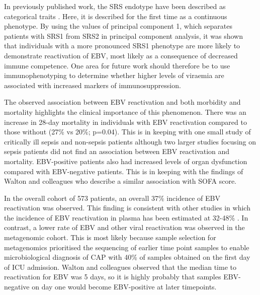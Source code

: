 In previously published work, the SRS endotype have been described as categorical traits \parencite{Davenport2016}. Here, it is described for the first time as a continuous phenotype. By using the values of principal component 1, which separates patients with SRS1 from SRS2 in principal component analysis, it was shown that individuals with a more pronounced SRS1 phenotype are more likely to demonstrate reactivation of EBV, most likely as a consequence of decreased immune competence. One area for future work should therefore be to use immunophenotyping to determine whether higher levels of viraemia are associated with increased markers of immunosuppression.

The observed association between EBV reactivation and both morbidity and mortality highlights the clinical importance of this phenomenon. There was an increase in 28-day mortality in individuals with EBV reactivation compared to those without (27\% vs 20\%; p=0.04). This is in keeping with one small study of critically ill sepsis and non-sepsis patients \parencite{Libert2015} although two larger studies focusing on sepsis patients  \parencite{Walton2014} \parencite{Ong2017} did not find an association between EBV reactivation and mortality. EBV-positive patients also had increased levels of organ dysfunction compared with EBV-negative patients. This is in keeping with the findings of Walton and colleagues \parencite{Walton2014} who describe a similar association with SOFA score.

In the overall cohort of 573 patients, an overall 37\% incidence of EBV reactivation was observed. This finding is consistent with other studies in which the incidence of EBV reactivation in plasma has been estimated at 32-48\% \parencite{Walton2014} \parencite{Ong2017}. In contrast, a lower rate of EBV and other viral reactivation was observed in the metagenomic cohort. This is most likely because sample selection for metagenomics prioritised the sequencing of earlier time point samples to enable microbiological diagnosis of CAP with 40\% of samples obtained on the first day of ICU admission. Walton and colleagues \parencite{Walton2014} observed that the median time to reactivation for EBV was 5 days, so it is highly probably that samples EBV-negative on day one would become EBV-positive at later timepoints.

